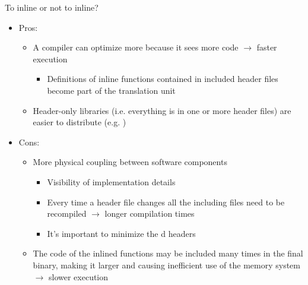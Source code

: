 \begin{frame}{To inline or not to inline?}

  \begin{itemize}
  \item Pros:
    \begin{itemize}
    \item A compiler can optimize more because it sees more code $\rightarrow$
      faster execution
      \begin{itemize}
      \item Definitions of inline functions contained in included header files
        become part of the translation unit
      \end{itemize}
    \item Header-only libraries (i.e. everything is in one or more header files)
      are easier to distribute (e.g. )
    \end{itemize}
  \item Cons:
    \begin{itemize}
    \item More physical coupling between software components
      \begin{itemize}
      \item Visibility of implementation details
      \item Every time a header file changes all the including files need to be
        recompiled $\rightarrow$ longer compilation times
      \item It's important to minimize the d headers
      \end{itemize}
    \item The code of the inlined functions may be included many times in the
      final binary, making it larger and causing inefficient use of the memory
      system $\rightarrow$ slower execution
    \end{itemize}
  \end{itemize}

\end{frame}

